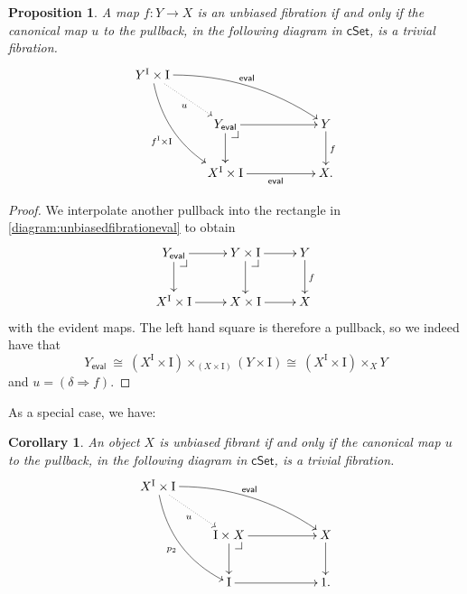 \documentclass[11pt,reqno]{amsart}
\makeatletter
\newcommand{\cSet}{\ensuremath{\mathsf{cSet}}}
\newcommand{\ra}{\ensuremath{\rightarrow}}
\newcommand{\I}{\ensuremath{\mathrm{I}}}
\newtheorem{proposition}[theorem]{Proposition}
\newtheorem{corollary}[theorem]{Corollary}
\theoremstyle{remark}
\theoremstyle{definition}
\newcommand{\pbcorner}[1][dr]{\save*!/#1-1.2pc/#1:(-1,1)@^{|-}\restore}
\makeatother
\begin{document}
\begin{proposition}
A map $f : Y\ra X$ is an unbiased fibration if and only if the canonical map $u$ to the pullback, in the following diagram in $\cSet$, is a trivial fibration.
\begin{equation}\label{diagram:unbiasedfibrationeval}
\xymatrix{
Y^\I\times \I \ar@/^3ex/ [rrrd]^{\mathsf{eval}} \ar@/_3ex/ [rdd]_{f^\I\times \I} \ar@{..>}[rd]_{u}  && \\
& Y_\mathsf{eval} \pbcorner  \ar[d] \ar[rr] && Y \ar[d]^f \\
& X^\I \times \I \ar[rr]_{\mathsf{eval}} && X.
}
\end{equation}
\end{proposition}
\begin{proof}
We interpolate another pullback into the rectangle in \eqref{diagram:unbiasedfibrationeval} to obtain
\begin{equation}\label{diagram:unbiasedfibrationeval2}
\xymatrix{
 Y_\mathsf{eval} \pbcorner  \ar[d] \ar[r] & Y\times \I \ar[d] \pbcorner \ar[r] & Y \ar[d]^f \\
 X^\I \times \I \ar[r] & X\times \I \ar[r] & X
}
\end{equation}
with the evident maps. The left hand square is therefore a pullback, so we indeed have that 
\[
Y_\mathsf{eval}\ \cong\ (X^\I \times \I)\times_{(X\times \I)} (Y\times\I) \cong\ (X^\I \times \I)\times_{X} Y
\]
and $u = (\delta\Rightarrow\! f)$.
\end{proof}

As a special case, we have:
\begin{corollary}\label{cor:unbiasedfibrant}
An object $X$ is unbiased fibrant if and only if the canonical map $u$ to the pullback, in the following diagram in $\cSet$, is a trivial fibration.
\begin{equation}\label{diagram:unbiasedfibrationeval3}
\xymatrix{
X^\I\times \I \ar@/^3ex/ [rrrd]^{\mathsf{eval}} \ar@/_3ex/ [rdd]_{p_2} \ar@{..>}[rd]_{u}  && \\
& \I\times X \pbcorner  \ar[d] \ar[rr] && X \ar[d] \\
& \I \ar[rr] && 1.
}
\end{equation}
\end{corollary}
\end{document}
